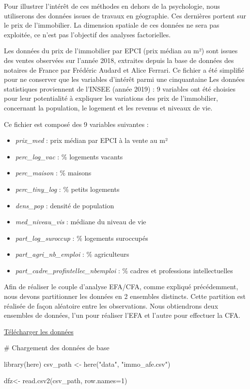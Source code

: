 \documentclass[
  french,
  11pt,
  a4paper,
]{article}
\newenvironment{Shaded}{}{}
\newcommand{\AttributeTok}[1]{\textcolor[rgb]{0.84,0.23,0.29}{#1}}
\newcommand{\CommentTok}[1]{\textcolor[rgb]{0.42,0.45,0.49}{#1}}
\newcommand{\DecValTok}[1]{\textcolor[rgb]{0.00,0.36,0.77}{#1}}
\newcommand{\FunctionTok}[1]{\textcolor[rgb]{0.44,0.26,0.76}{#1}}
\newcommand{\NormalTok}[1]{\textcolor[rgb]{0.14,0.16,0.18}{#1}}
\newcommand{\OtherTok}[1]{\textcolor[rgb]{0.44,0.26,0.76}{#1}}
\newcommand{\StringTok}[1]{\textcolor[rgb]{0.01,0.18,0.38}{#1}}
\providecommand{\tightlist}{%
  \setlength{\itemsep}{0pt}\setlength{\parskip}{0pt}}
\begin{document}
Pour illustrer l'intérêt de ces méthodes en dehors de la psychologie,
nous utiliserons des données issues de travaux en géographie. Ces
dernières portent sur le prix de l'immobilier. La dimension spatiale de
ces données ne sera pas exploitée, ce n'est pas l'objectif des analyses
factorielles.

Les données du prix de l'immobilier par EPCI (prix médian au m²) sont
issues des ventes observées sur l'année 2018, extraites depuis la base
de données des notaires de France par Frédéric Audard et Alice Ferrari.
Ce fichier a été simplifié pour ne conserver que les variables d'intérêt
parmi une cinquantaine Les données statistiques proviennent de l'INSEE
(année 2019) : 9 variables ont été choisies pour leur potentialité à
expliquer les variations des prix de l'immobilier, concernant la
population, le logement et les revenus et niveaux de vie.

Ce fichier est composé des 9 variables suivantes :

\begin{itemize}
\tightlist
\item
  \emph{prix\_med} : prix médian par EPCI à la vente au m²
\item
  \emph{perc\_log\_vac} : \% logements vacants
\item
  \emph{perc\_maison} : \% maisons
\item
  \emph{perc\_tiny\_log} : \% petits logements
\item
  \emph{dens\_pop} : densité de population
\item
  \emph{med\_niveau\_vis} : médiane du niveau de vie
\item
  \emph{part\_log\_suroccup} : \% logements suroccupés
\item
  \emph{part\_agri\_nb\_emploi} : \% agriculteurs
\item
  \emph{part\_cadre\_profintellec\_nbemploi} : \% cadres et professions
  intellectuelles
\end{itemize}

Afin de réaliser le couple d'analyse EFA/CFA, comme expliqué
précédemment, nous devons partitionner les données en 2 ensembles
distincts. Cette partition est réalisée de façon aléatoire entre les
observations. Nous obtiendrons deux ensembles de données, l'un pour
réaliser l'EFA et l'autre pour effectuer la CFA.

\href{https://github.com/LeCampionG/Article_Rzine-AFE/raw/main/data/data.zip}{{}
Télécharger les données}

\begin{Shaded}
\begin{Highlighting}[]
\CommentTok{\# Chargement des données de base}

\FunctionTok{library}\NormalTok{(here)}
\NormalTok{csv\_path }\OtherTok{\textless{}{-}} \FunctionTok{here}\NormalTok{(}\StringTok{"data"}\NormalTok{, }\StringTok{"immo\_afe.csv"}\NormalTok{)}

\NormalTok{dfz}\OtherTok{\textless{}{-}} \FunctionTok{read.csv2}\NormalTok{(csv\_path, }\AttributeTok{row.names=}\DecValTok{1}\NormalTok{)}
\end{Highlighting}
\end{Shaded}
\end{document}

